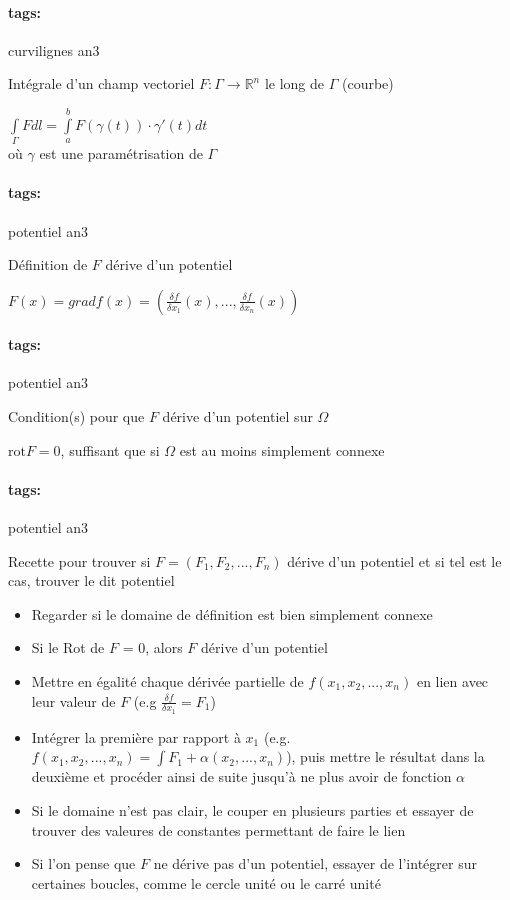 \documentclass[12pt]{article}
\newcommand*{\xfield}[1]{\begin{mdframed}\centering #1\end{mdframed}\bigskip}
\newenvironment{note}{}{}
\newcommand*{\tags}[1]{\paragraph{tags: }#1}
\begin{document}
\begin{note}
	\tags{curvilignes an3}
	\xfield{Intégrale d'un champ vectoriel $F: \Gamma \to \mathbb{R}^n$ le long de
    $\Gamma$ (courbe)}
	\xfield{$\int\limits_\Gamma F dl = \int\limits_a^b F(\gamma(t)) \cdot \gamma'(t)
    dt$\\
où $\gamma$ est une paramétrisation de $\Gamma$}
\end{note}

\begin{note}
	\tags{potentiel an3}
	\xfield{Définition de $F$ dérive d'un potentiel}
	\xfield{$F(x) = grad f(x) = \left( \frac{\delta f}{\delta x_1} (x), ... ,
      \frac{\delta f}{\delta x_n} (x) \right)$}
\end{note}

\begin{note}
	\tags{potentiel an3}
	\xfield{Condition(s) pour que $F$ dérive d'un potentiel sur $\Omega$}
	\xfield{$\text{rot} F = 0$, suffisant que si $\Omega$ est au moins simplement connexe}
\end{note}

\begin{note}
	\tags{potentiel an3}
	\xfield{Recette pour trouver si $F = (F_1,F_2,...,F_n)$ dérive d'un potentiel et si tel est le cas, trouver le dit
    potentiel}
	\xfield{\begin{itemize}
      \item[]{Regarder si le domaine de définition est bien simplement connexe}
      \item[]{Si le Rot de $F$ = 0, alors $F$ dérive d'un potentiel}
      \item[]{Mettre en égalité chaque dérivée partielle de $f(x_1,x_2,...,x_n)$ en lien avec leur
          valeur de $F$ (e.g $\frac{\delta f}{\delta x_1} = F_1$)}
        \item[]{Intégrer la première par rapport à $x_1$ (e.g. $f(x_1,x_2,...,x_n)
            = \int F_1 + \alpha(x_2,...,x_n)$), puis mettre le résultat dans la
            deuxième et procéder ainsi de suite jusqu'à ne plus avoir de
            fonction $\alpha$}
          \item[]{Si le domaine n'est pas clair, le couper en plusieurs parties
              et essayer de trouver des valeures de constantes permettant de
              faire le lien}
            \item[]{Si l'on pense que $F$ ne dérive pas d'un potentiel, essayer
                de l'intégrer sur certaines boucles, comme le cercle unité ou le
              carré unité}
    \end{itemize}}
\end{note}
\end{document}
